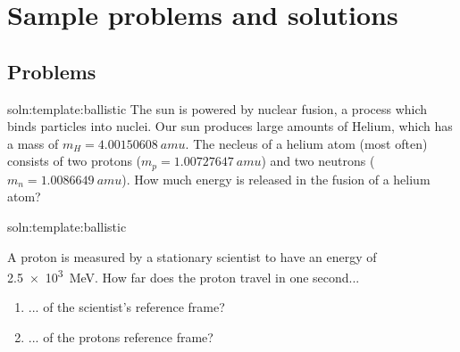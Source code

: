 \newpage
\section{Sample problems and solutions}
\subsection{Problems}


\begin{problem}{soln:template:ballistic}{\label{prob:template:ballistic} 
The sun is powered by nuclear fusion, a process which binds particles into nuclei. Our sun produces large amounts of Helium, which has a mass of $m_H = \SI{4.00150608}{amu}$. The necleus of a helium atom (most often) consists of two protons ($m_p = \SI{1.00727647}{amu}$) and two neutrons ($m_n = \SI{1.0086649}{amu}$). How much energy is released in the fusion of a helium atom?
}
\end{problem}

\begin{problem}{soln:template:ballistic}{\label{prob:template:ballistic} 
		A proton is measured by a stationary scientist to have an energy of \SI{2.5e3}{MeV}. How far does the proton travel in one second...
		\begin{enumerate}[label=\alph*),topsep=-10pt]
			\item ... of the scientist's reference frame?
			\item ... of the protons reference frame?
		\end{enumerate}
	}
\end{problem}

\newpage
